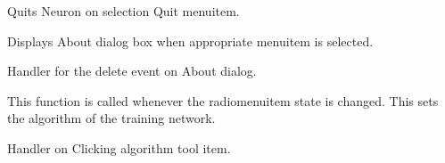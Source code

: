 \documentclass[letterpaper,10pt,english]{sphinxmanual}
\begin{document}
\begin{fulllineitems}
\begin{fulllineitems}
\end{fulllineitems}



\begin{fulllineitems}
\label{index:neuron.neuron.on_Quit_activate}
Quits Neuron on selection Quit menuitem.

\end{fulllineitems}



\begin{fulllineitems}
\label{index:neuron.neuron.on_about_menuitem_activate}
Displays About dialog box when appropriate menuitem
is selected.

\end{fulllineitems}



\begin{fulllineitems}
\label{index:neuron.neuron.on_aboutdialog_delete_event}
Handler for the delete event on About dialog.

\end{fulllineitems}



\begin{fulllineitems}
\label{index:neuron.neuron.on_algorithm_changed}
This function is called whenever the radiomenuitem 
state is changed. This sets the algorithm of the 
training network.

\end{fulllineitems}



\begin{fulllineitems}
\label{index:neuron.neuron.on_algorithm_clicked}
Handler on Clicking algorithm tool item.


\end{fulllineitems}
\end{fulllineitems}
\end{document}

